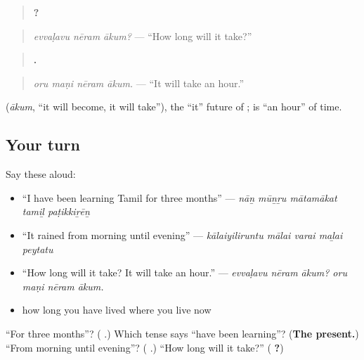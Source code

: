\begin{quote}
\textbf{  ?}
\end{quote}

\begin{quote}
\emph{evvaḷavu nēram ākum?} — \textquotedblleft{}How long will it take?\textquotedblright{}
\end{quote}

\begin{quote}
\textbf{   .}
\end{quote}

\begin{quote}
\emph{oru maṇi nēram ākum.} — \textquotedblleft{}It will take an hour.\textquotedblright{}
\end{quote}

\textbf{} (\emph{ākum}, \textquotedblleft{}it will become, it will take\textquotedblright{}), the \textquotedblleft{}it\textquotedblright{} future of \textbf{}; \textbf{ } is \textquotedblleft{}an hour\textquotedblright{} of time.

\subsection*{Your turn}
Say these aloud:

\begin{itemize}
\raggedright
  \item \textquotedblleft{}I have been learning Tamil for three months\textquotedblright{} — \emph{nāṉ mūṉṟu mātamākat tamiḻ paṭikkiṟēṉ}
  \item \textquotedblleft{}It rained from morning until evening\textquotedblright{} — \emph{kālaiyiliruntu mālai varai maḻai peytatu}
  \item \textquotedblleft{}How long will it take? It will take an hour.\textquotedblright{} — \emph{evvaḷavu nēram ākum? oru maṇi nēram ākum.}
  \item how long you have lived where you live now
\end{itemize}

\begin{tcolorbox}[breakable,colback=teal!4,colframe=teal!35!black,title={Before you move on}]
\textquotedblleft{}For three months\textquotedblright{}? (\textbf{ }.) Which tense says \textquotedblleft{}have been learning\textquotedblright{}? (\textbf{The present.}) \textquotedblleft{}From morning until evening\textquotedblright{}? (\textbf{  }.) \textquotedblleft{}How long will it take?\textquotedblright{} (\textbf{  ?})
\end{tcolorbox}
